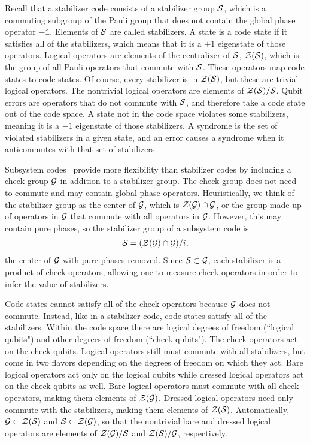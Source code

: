 Recall that a stabilizer code consists of a stabilizer group $\S$, which is a commuting subgroup of the Pauli group that does not contain the global phase operator $-\mathds{1}$. Elements of $\S$ are called stabilizers. A state is a code state if it satisfies all of the stabilizers, which means that it is a $+1$ eigenstate of those operators. Logical operators are elements of the centralizer of $\S$, $\Z(\S)$, which is the group of all Pauli operators that commute with $\S$.
These operators map code states to code states. Of course, every stabilizer is in $\Z(\S)$, but these are trivial logical operators. The nontrivial logical operators are elements of $\Z(\S) / \S$. Qubit errors are operators that do not commute with $\S$, and therefore take a code state out of the code space. A state not in the code space violates some stabilizers, meaning it is a $-1$ eigenstate of those stabilizers. 
A syndrome is the set of violated stabilizers in a given state, and an error causes a syndrome when it anticommutes with that set of stabilizers. 

Subsystem codes~\cite{Poulin2005Subsystem} provide more flexibility than stabilizer codes by including a check group $\G$ in addition to a stabilizer group. The check group does not need to commute and may contain global phase operators. Heuristically, we think of the stabilizer group as the center of $\G$, which is $\Z(\G) \cap \G$, or the group made up of operators in $\G$ that commute with all operators in $\G$. However, this may contain pure phases, so the stabilizer group of a subsystem code is
\begin{align}
\S = (\Z(\G) \cap \G) / i,
\end{align}
the center of $\G$ with pure phases removed. Since $\S \subset \G$, each stabilizer is a product of check operators, allowing one to measure check operators in order to infer the value of stabilizers.

Code states cannot satisfy all of the check operators because $\G$ does not commute. Instead, like in a stabilizer code, code states satisfy all of the stabilizers. Within the code space there are logical degrees of freedom (``logical qubits") and other degrees of freedom (``check qubits").
The check operators act on the check qubits. Logical operators still must commute with all stabilizers, but come in two flavors depending on the degrees of freedom on which they act. Bare logical operators act only on the logical qubits while dressed logical operators act on the check qubits as well. Bare logical operators must commute with all check operators, making them elements of $\Z(\G)$. Dressed logical operators need only commute with the stabilizers, making them elements of $\Z(\S)$. Automatically, $\G \subset \Z(\S)$ and $\S \subset \Z(\G)$, so that the nontrivial bare and dressed logical operators are elements of $\Z(\G)/\S$ and $\Z(\S)/\G$, respectively.

